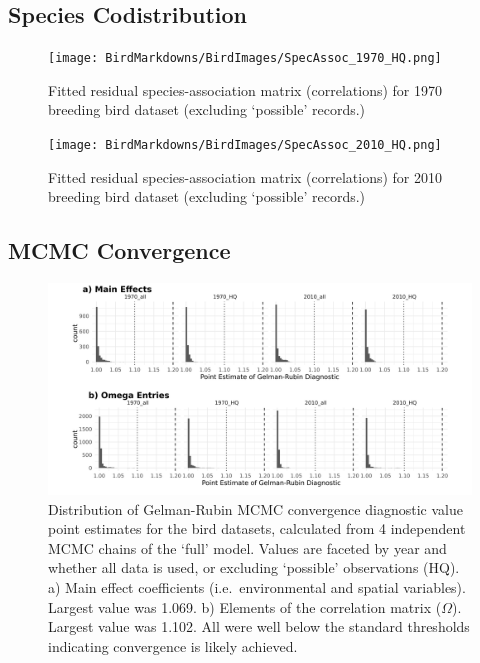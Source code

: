\documentclass[
]{article}
\begin{document}
\hypertarget{species-codistribution}{%
\subsection{Species Codistribution}\label{species-codistribution}}

\begin{figure}
\centering
\texttt{[image: BirdMarkdowns/BirdImages/SpecAssoc\_1970\_HQ.png]}
\caption{Fitted residual species-association matrix (correlations) for
1970 breeding bird dataset (excluding `possible' records.)}
\end{figure}

\begin{figure}
\centering
\texttt{[image: BirdMarkdowns/BirdImages/SpecAssoc\_2010\_HQ.png]}
\caption{Fitted residual species-association matrix (correlations) for
2010 breeding bird dataset (excluding `possible' records.)}
\end{figure}

\hypertarget{mcmc-convergence}{%
\subsection{MCMC Convergence}\label{mcmc-convergence}}

\begin{figure}
\centering
\includegraphics{BirdMarkdowns/BirdImages/ModelCovergence.png}
\caption{Distribution of Gelman-Rubin MCMC convergence diagnostic value
point estimates for the bird datasets, calculated from 4 independent
MCMC chains of the `full' model. Values are faceted by year and whether
all data is used, or excluding `possible' observations (HQ). a) Main
effect coefficients (i.e.~environmental and spatial variables). Largest
value was 1.069. b) Elements of the correlation matrix (\(\Omega\)).
Largest value was 1.102. All were well below the standard thresholds
indicating convergence is likely achieved.}
\end{figure}
\end{document}

